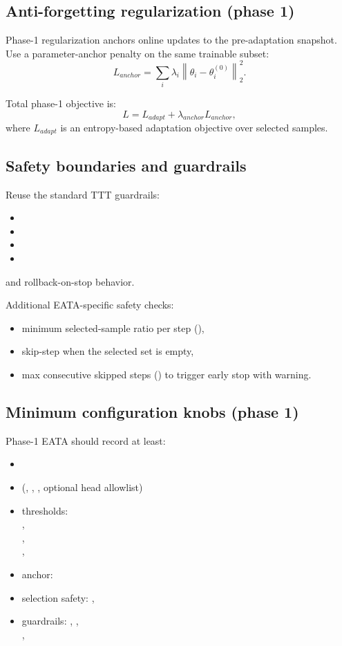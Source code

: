\subsection{Anti-forgetting regularization (phase 1)}
Phase-1 regularization anchors online updates to the pre-adaptation snapshot.
Use a parameter-anchor penalty on the same trainable subset:
\[
L_{anchor} = \sum_i \lambda_i \left\| \theta_i - \theta_i^{(0)} \right\|_2^2.
\]

Total phase-1 objective is:
\[
L = L_{adapt} + \lambda_{anchor} L_{anchor},
\]
where $L_{adapt}$ is an entropy-based adaptation objective over selected samples.

\subsection{Safety boundaries and guardrails}
Reuse the standard TTT guardrails:
\begin{itemize}
  \item {}
  \item {}
  \item {}
  \item {}
\end{itemize}
and rollback-on-stop behavior.

Additional EATA-specific safety checks:
\begin{itemize}
  \item minimum selected-sample ratio per step (),
  \item skip-step when the selected set is empty,
  \item max consecutive skipped steps () to trigger early stop with warning.
\end{itemize}

\subsection{Minimum configuration knobs (phase 1)}
Phase-1 EATA should record at least:
\begin{itemize}
  \item {}
  \item {} (, , , optional head allowlist)
  \item thresholds: \\
    , \\
    , \\
    , \\
  \item anchor: 
  \item selection safety: , 
  \item guardrails: , , \\
    , 
\end{itemize}

